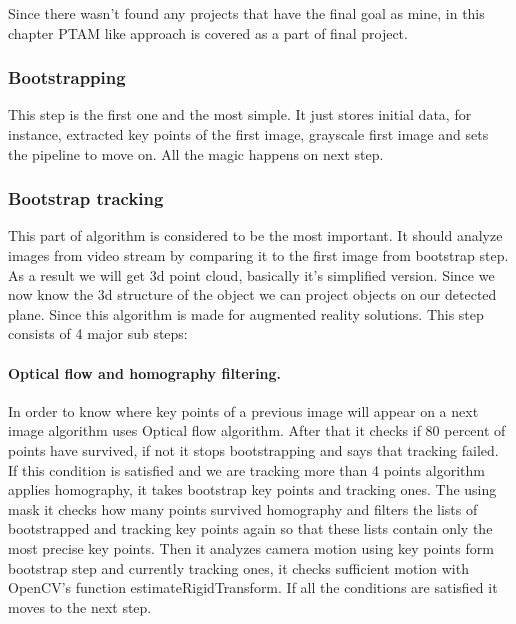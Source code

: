\documentclass[../../main]{subfiles}
\begin{document}
Since there wasn’t found any projects that have the final goal as mine, in this chapter PTAM like approach is covered as a part of final project.

\subsubsection{Bootstrapping}
This step is the first one and the most simple. It just stores initial data, for instance, extracted key points of the first image, grayscale first image and sets the pipeline to move on. All the magic happens on next step.

\subsubsection{Bootstrap tracking}
This part of algorithm is considered to be the most important. It should analyze images from video stream by comparing it to the first image from bootstrap step. As a result we will get 3d point cloud, basically it’s simplified version. Since we now know the 3d structure of the object we can project objects on our detected plane. Since this algorithm is made for augmented reality solutions.
This step consists of 4 major sub steps:

\paragraph{Optical flow and homography filtering.}
In order to know where key points of a previous image will appear on a next image algorithm uses Optical flow algorithm. After that it checks if 80 percent of points have survived, if not it stops bootstrapping and says that tracking failed. If this condition is satisfied and we are tracking more than 4 points algorithm applies homography, it takes bootstrap key points and tracking ones. The using mask it checks how many points survived homography and filters the lists of bootstrapped and tracking key points again so that these lists contain only the most precise key points. Then it analyzes camera motion using key points form bootstrap step and currently tracking ones, it checks sufficient motion with OpenCV’s function estimateRigidTransform. If all the conditions are satisfied it moves to the next step.
\end{document}
